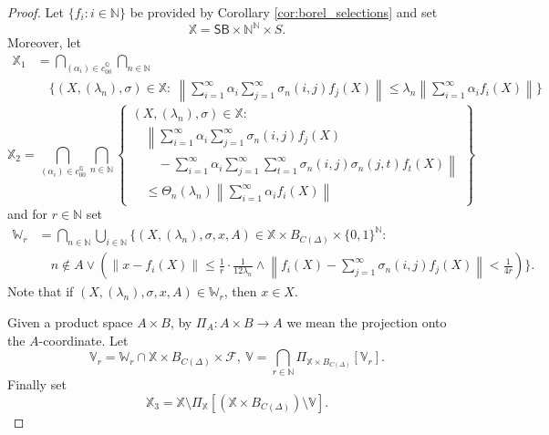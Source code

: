 \documentclass[12pt,fleqn]{amsart}
\newcommand{\IQ}{\mathbb{Q}}
\newcommand{\IN}{\mathbb{N}}
\newcommand{\FF}{\mathscr{F}}
\renewcommand{\leq}{\leqslant}
\theoremstyle{definition}
\theoremstyle{remark}
\begin{document}
\begin{proof}
    Let $\{f_i:i\in \IN\}$ be provided by Corollary \ref{cor:borel_selections} and set
    \[
    \mathbb{X}= \mathsf{SB} \times \IN^\IN \times S.
    \]
    Moreover, let 
    \begin{align*}
\mathbb{X}_1 
&= \bigcap_{(\alpha_i) \in c_{00}^\mathbb{Q}} 
    \bigcap_{n \in \mathbb{N}} 
\\
&\quad \Bigg\{ (X, (\lambda_n), \sigma)\in\mathbb{X}\colon\ 
    \left\| \sum_{i=1}^\infty \alpha_i 
      \sum_{j=1}^\infty \sigma_{n}(i, j) f_j(X) 
    \right\| 
    \leq \lambda_n 
    \left\| \sum_{i=1}^\infty \alpha_i f_i(X) \right\| 
  \Bigg\}
\end{align*}
        \[
        \mathbb{X}_{2} =  \bigcap_{(\alpha_i) \in c_{00}^\IQ}\bigcap_{n\in\IN}\left\{
        \begin{array}{l}
        \left( X, (\lambda_n), \sigma \right)\in \mathbb{X} \colon \\
        \quad \left\|
        \sum_{i=1}^\infty \alpha_i \sum_{j=1}^\infty \sigma_{n}(i, j) f_j(X)\right.\\ 
        \qquad- 
        \left.\sum_{i=1}^\infty \alpha_i \sum_{j=1}^\infty \sum_{t=1}^\infty 
        \sigma_{n}(i, j) \sigma_{n}(j, t) f_t(X) 
        \right\| \\
        \quad \leq \Theta_n(\lambda_n) \left\| \sum_{i=1}^\infty \alpha_i f_i(X) \right\|
        \end{array}
        \right\}
    \]
    and for $r\in\IN$ set
        \begin{align*}
\mathbb{W}_{r}
&= 
    \bigcap_{n\in\IN}
     \bigcup_{i \in \mathbb{N}} 
    \Bigg\{ (X, (\lambda_n), \sigma, x,  A)\in \mathbb{X}\times B_{C(\Delta)}\times \{0,1\}^\IN \colon
\\
&\quad n \notin A \vee \left(
\| x-f_i(X)\| \leq \frac1r\cdot\frac{1}{12\lambda_n} \wedge \left\|f_i(X) - \sum_{j=1}^\infty \sigma_{n}(i,j) f_j(X)\right\| < \frac{1}{4r}\right)
  \Bigg\}.
\end{align*}
Note that if $(X, (\lambda_n), \sigma, x,  A)\in \mathbb{W}_r$, then $x\in X$.

Given a product space $A\times B$, by $\Pi_A\colon A\times B \to A$ we mean the projection onto the \(A\)-coordinate. Let 
\[
\mathbb{V}_r=\mathbb{W}_r \cap \mathbb{X}\times B_{C(\Delta)}\times \FF, \  \mathbb{V}=\bigcap_{r\in\IN}  \Pi_{\mathbb{X}\times B_{C(\Delta)}} [\mathbb{V}_r].
\]
Finally set 
\[
\mathbb{X}_3 = \mathbb{X} \setminus \Pi_{\mathbb{X}}\left[\left( \mathbb{X} \times B_{C(\Delta)}\right)\setminus \mathbb{V}\right].
\]


\end{proof}
\end{document}
